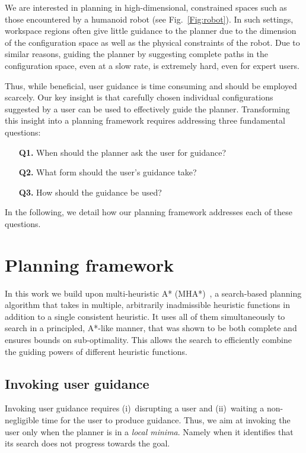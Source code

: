 \documentclass[conference]{IEEEtran}
\begin{document}
We are interested in planning in high-dimensional, constrained spaces such as those encountered by a humanoid robot (see Fig.~\ref{Fig:robot}).
In such settings, workspace regions often give little guidance to the planner due to the dimension of the configuration space as well as the physical constraints of the robot.
Due to similar reasons, guiding the planner by suggesting complete paths in the configuration space, even at a slow rate, is extremely hard, even for expert users.

Thus,  while beneficial, user guidance is  time consuming and should be employed scarcely.
Our key insight is that carefully chosen individual configurations suggested by a user can be used to effectively guide the planner.
Transforming this insight into a planning framework requires addressing three fundamental questions:

\begin{itemize}
	\item[\textbf{Q1.}] When should the planner ask the user for guidance?
	\item[\textbf{Q2.}] What form should the user's guidance take?
	\item[\textbf{Q3.}] How should the guidance be used?
\end{itemize}
 
In the following, we detail how our planning framework addresses each of these questions.
\section{Planning framework}
\label{sec:planning}
In this work we build upon multi-heuristic A* (MHA*)~\cite{ASNHL16}, a search-based planning algorithm that takes in multiple, arbitrarily inadmissible heuristic functions in addition to a single consistent heuristic.
It uses all of them simultaneously to search in a principled, A*-like manner, that was shown to be both complete and ensures bounds on sub-optimality. 
This allows the search to efficiently combine the guiding powers of different heuristic functions. 

\subsection{Invoking user guidance}
Invoking user guidance requires (i)~disrupting a user and (ii)~waiting a non-negligible time for the user to produce guidance.
Thus, we aim at invoking the user only when the planner is in a \emph{local minima}. Namely when it identifies that its search does not progress towards the goal. 
\end{document}
